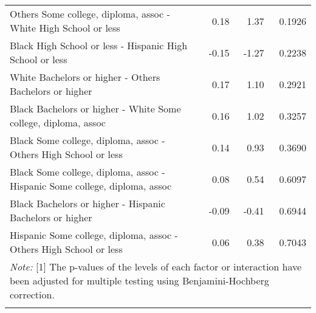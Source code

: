 \begin{center}
\begin{longtable}{lrrr}
    Others Some college, diploma, assoc -  White High School or less & 0.18 & 1.37 & 0.1926 \\ 
    Black High School or less -  Hispanic High School or less & -0.15 & -1.27 & 0.2238 \\ 
    White Bachelors or higher -  Others Bachelors or higher & 0.17 & 1.10 & 0.2921 \\ 
    Black Bachelors or higher -  White Some college, diploma, assoc & 0.16 & 1.02 & 0.3257 \\ 
    Black Some college, diploma, assoc -  Others High School or less & 0.14 & 0.93 & 0.3690 \\ 
    Black Some college, diploma, assoc -  Hispanic Some college, diploma, assoc & 0.08 & 0.54 & 0.6097 \\ 
    Black Bachelors or higher -  Hispanic Bachelors or higher & -0.09 & -0.41 & 0.6944 \\ 
    Hispanic Some college, diploma, assoc -  Others High School or less & 0.06 & 0.38 & 0.7043 \\ 
   \hline
\multicolumn{4}{l}{
  \begin{minipage}{15cm}
\textit{Note:} [1] The p-values of the levels of each factor or interaction have been adjusted for multiple testing using Benjamini-Hochberg correction.
  \end{minipage}
}\\
\label{tab:Table3PostHoc}

\end{longtable}

\end{center}

\doublespacing

